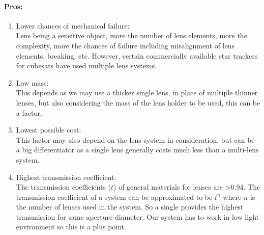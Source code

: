 \documentclass[../../main.tex]{subfiles}
\begin{document}
\paragraph{Pros:}
\begin{enumerate}
    \item Lower chances of mechanical failure:
    \\Lens being a sensitive object, more the number of lens elements, more the complexity, more the chances of failure  including misalignment of lens elements, breaking, etc. However, certain commercially available star trackers for cubesats have used multiple lens systems.
    \item Low mass:
    \\This depends as we may use a thicker single lens, in place of multiple thinner lenses, but also considering the mass of the lens holder to be used, this can be a factor.
    \item Lowest possible cost:
    \\This factor may also depend on the lens system in consideration, but can be a big differentiator as a single lens generally costs much less than a multi-lens system.
    \item Highest transmission coefficient:
    \\The transmission coefficients ($t$) of general materials for lenses are \textgreater 0.94. The transmission coefficient of a system can be approximated to be $t^n$ where $n$ is the number of lenses used in the system. So a single provides the highest transmission for same aperture diameter. Our system has to work in low light environment so this is a plus point.
\end{enumerate}
\end{document}

